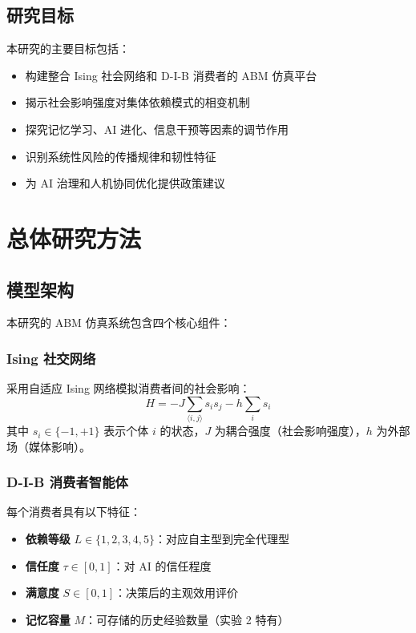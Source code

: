 \documentclass[a4paper,12pt]{article}
\begin{document}
\subsection{研究目标}

本研究的主要目标包括：
\begin{itemize}
    \item 构建整合 Ising 社会网络和 D-I-B 消费者的 ABM 仿真平台
    \item 揭示社会影响强度对集体依赖模式的相变机制
    \item 探究记忆学习、AI 进化、信息干预等因素的调节作用
    \item 识别系统性风险的传播规律和韧性特征
    \item 为 AI 治理和人机协同优化提供政策建议
\end{itemize}

\section{总体研究方法}

\subsection{模型架构}

本研究的 ABM 仿真系统包含四个核心组件：

\subsubsection{Ising 社交网络}

采用自适应 Ising 网络模拟消费者间的社会影响：
\begin{equation}
    H = -J \sum_{\langle i,j \rangle} s_i s_j - h \sum_i s_i
\end{equation}
其中 $s_i \in \{-1, +1\}$ 表示个体 $i$ 的状态，$J$ 为耦合强度（社会影响强度），$h$ 为外部场（媒体影响）。

\subsubsection{D-I-B 消费者智能体}

每个消费者具有以下特征：
\begin{itemize}
    \item \textbf{依赖等级} $L \in \{1,2,3,4,5\}$：对应自主型到完全代理型
    \item \textbf{信任度} $\tau \in [0,1]$：对 AI 的信任程度
    \item \textbf{满意度} $S \in [0,1]$：决策后的主观效用评价
    \item \textbf{记忆容量} $M$：可存储的历史经验数量（实验 2 特有）
\end{itemize}
\end{document}
